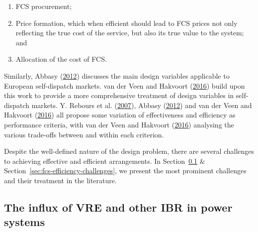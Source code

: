 \documentclass[12pt,a4paper,]{report}
\begin{document}
\begin{enumerate}
\def\labelenumi{\arabic{enumi}.}
\item
  FCS procurement;
\item
  Price formation, which when efficient should lead to FCS prices not
  only reflecting the true cost of the service, but also its true value
  to the system; and
\item
  Allocation of the cost of FCS.
\end{enumerate}

Similarly, Abbasy
(\protect\hyperlink{ref-abbasyNationalDesignMultinational2012}{2012})
discusses the main design variables applicable to European self-dispatch
markets. van der Veen and Hakvoort
(\protect\hyperlink{ref-vanderveenElectricityBalancingMarket2016}{2016})
build upon this work to provide a more comprehensive treatment of design
variables in self-dispatch markets. Y. Rebours et al.
(\protect\hyperlink{ref-reboursFundamentalDesignIssues2007}{2007}),
Abbasy
(\protect\hyperlink{ref-abbasyNationalDesignMultinational2012}{2012})
and van der Veen and Hakvoort
(\protect\hyperlink{ref-vanderveenElectricityBalancingMarket2016}{2016})
all propose some variation of effectiveness and efficiency as
performance criteria, with van der Veen and Hakvoort
(\protect\hyperlink{ref-vanderveenElectricityBalancingMarket2016}{2016})
analysing the various trade-offs between and within each criterion.

Despite the well-defined nature of the design problem, there are several
challenges to achieving effective and efficient arrangements. In
Section~\ref{sec:fcs-ibr-challenges} \&
Section~\ref{sec:fcs-efficiency-challenges}, we present the most
prominent challenges and their treatment in the literature.

\hypertarget{sec:fcs-ibr-challenges}{%
\subsection{The influx of VRE and other IBR in power
systems}\label{sec:fcs-ibr-challenges}}
\end{document}
